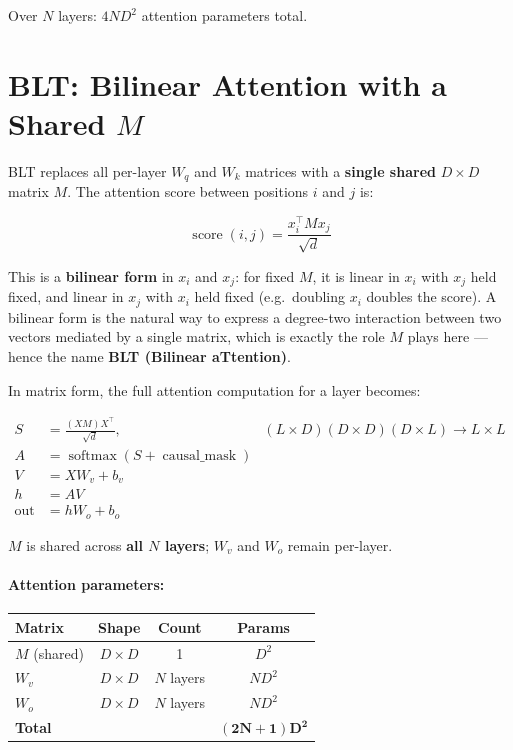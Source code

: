 \documentclass[11pt]{article}
\begin{document}
Over $N$ layers: $4ND^2$ attention parameters total.

\section{BLT: Bilinear Attention with a Shared $M$}

BLT replaces all per-layer $W_q$ and $W_k$ matrices with a \textbf{single shared} $D\times D$ matrix $M$. The attention score between positions $i$ and $j$ is:

\begin{equation*}
\operatorname{score}(i,j) = \frac{x_i^\top M x_j}{\sqrt{d}}
\end{equation*}

This is a \textbf{bilinear form} in $x_i$ and $x_j$: for fixed $M$, it is linear in $x_i$ with $x_j$ held fixed, and linear in $x_j$ with $x_i$ held fixed (e.g.\ doubling $x_i$ doubles the score). A bilinear form is the natural way to express a degree-two interaction between two vectors mediated by a single matrix, which is exactly the role $M$ plays here --- hence the name \textbf{BLT (Bilinear aTtention)}.

In matrix form, the full attention computation for a layer becomes:

\begin{align*}
S &= \frac{(XM)X^\top}{\sqrt{d}}, & (L\times D)(D\times D)(D\times L) \rightarrow L\times L\\
A &= \operatorname{softmax}(S + \operatorname{causal\_mask})\\
V &= X W_v + b_v\\
h &= AV\\
\operatorname{out} &= h W_o + b_o
\end{align*}

$M$ is shared across \textbf{all $N$ layers}; $W_v$ and $W_o$ remain per-layer.

\paragraph{Attention parameters:}

\begin{center}
\begin{tabular}{lccc}
\toprule
Matrix & Shape & Count & Params \\
\midrule
$M$ (shared) & $D\times D$ & 1 & $D^2$ \\
$W_v$ & $D\times D$ & $N$ layers & $ND^2$ \\
$W_o$ & $D\times D$ & $N$ layers & $ND^2$ \\
\midrule
\textbf{Total} & & & $\mathbf{(2N+1)D^2}$ \\
\bottomrule
\end{tabular}
\end{center}
\end{document}
